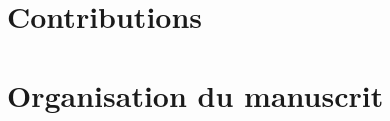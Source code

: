 \def\parampatchimagewidth{80mm}
\def\parampatchimageheight{60mm}
\def\parampatchshadowtransparency{0.4}


\section{Contributions}%


\section{Organisation du manuscrit}